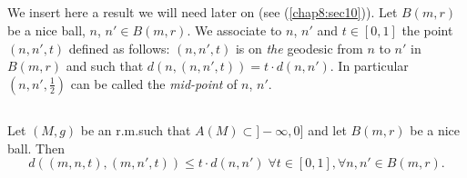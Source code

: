 \setcounter{subsection}{6}
\subsection{}\label{chap7:7.3.7}
We insert here a result we will need later on (see (\ref{chap8:sec10})). Let
$B(m,r)$ be a nice ball, $n$, $n'\in B(m,r)$. We associate to $n$,
$n'$ and $t\in [0,1]$ the point $(n,n',t)$ defined as follows:
$(n,n',t)$ is on {\em the} geodesic from $n$ to $n'$ in $B(m,r)$ and
such that $d(n,(n,n',t))=t\cdot d(n,n')$. In particular
$(n,n',\frac{1}{2})$ can be called the {\em mid-point} of $n$, $n'$.


\subsection{}\label{chap7:7.3.8}

\begin{prop*}
Let $(M,g)$ be an r.m.\@ such that $A(M)\subset ]-\infty,0]$ and let
$B(m,r)$ be a nice ball. Then
$$
d((m,n,t),(m,n',t))\leq t\cdot d(n,n')\;\forall t\in [0,1],\forall
n,n'\in B(m,r).
$$
\end{prop*}

